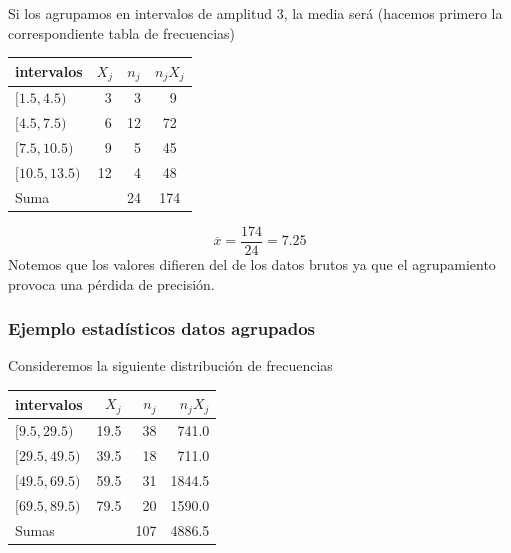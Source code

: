 \begin{frame}
Si los agrupamos en intervalos de amplitud $3$, la media será (hacemos primero la
correspondiente tabla de frecuencias)
\begin{center}
\begin{tabular}{lccc}
intervalos    & $X_j$ & $n_j$ & $n_jX_j$ \\ \hline $[1.5,4.5)$   &  \ 3 &  \ 3 &   \ 9 \\
\hline $[4.5,7.5)$   &  \ 6  & 12 &  72 \\ \hline $[7.5,10.5)$  &  \ 9 &  \ 5 &  45 \\
\hline $[10.5,13.5)$ & 12  &  \ 4 &  48 \\ \hline\hline
  Suma        &   & 24   & 174
\end{tabular}
\end{center}

$$\overline{x}= \frac{174}{24}=7.25$$
Notemos que los valores difieren del de los datos brutos ya que el agrupamiento provoca una pérdida de
precisión.
\end{frame}


\begin{frame}
\frametitle{Ejemplo estadísticos datos agrupados}

Consideremos la siguiente distribución de frecuencias

\begin{center}
\begin{tabular}{l|r|r|r|}
intervalos    & $X_j$ & $n_j$ & $n_jX_j$ \\ \hline $[9.5,29.5)$   & 19.5 &  38 &   741.0
\\ $[29.5,49.5)$  & 39.5 &  18 &   711.0 \\ $[49.5,69.5)$  & 59.5 &  31 & 1844.5 \\
$[69.5,89.5)$  & 79.5 &  20 &  1590.0   \\ \hline
    Sumas      &      & 107 &  4886.5
\end{tabular}
\end{center}
\end{frame}

